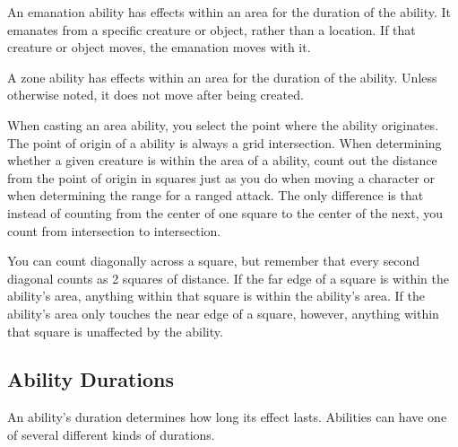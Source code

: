              An emanation ability has effects within an area for the duration of the ability.
            It emanates from a specific creature or object, rather than a location.
            If that creature or object moves, the emanation moves with it.

             A zone ability has effects within an area for the duration of the ability.
            Unless otherwise noted, it does not move after being created.

            When casting an area ability, you select the point where the ability originates.
            The point of origin of a ability is always a grid intersection.
            When determining whether a given creature is within the area of a ability, count out the distance from the point of origin in squares just as you do when moving a character or when determining the range for a ranged attack.
            The only difference is that instead of counting from the center of one square to the center of the next, you count from intersection to intersection.


            You can count diagonally across a square, but remember that every second diagonal counts as 2 squares of distance.
            If the far edge of a square is within the ability's area, anything within that square is within the ability's area.
            If the ability's area only touches the near edge of a square, however, anything within that square is unaffected by the ability.

    \subsection{Ability Durations}\label{Ability Durations}

        An ability's duration determines how long its effect lasts.
        Abilities can have one of several different kinds of durations.


